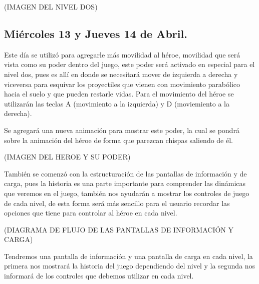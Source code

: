\documentclass{article}
\begin{document}
(IMAGEN DEL NIVEL DOS)

\subsection{Miércoles 13 y Jueves 14 de Abril.}
Este día se utilizó para agregarle más movilidad al héroe, movilidad que será vista como su poder dentro del juego, este poder será activado en especial para el nivel dos, pues es allí en donde se necesitará mover de izquierda a derecha y viceversa para esquivar los proyectiles que vienen con movimiento parabólico hacia el suelo y que pueden restarle vidas. Para el movimiento del héroe se utilizarán las teclas A (movimiento a la izquierda) y D (moviemiento a la derecha).

Se agregará una nueva animación para mostrar este poder, la cual se pondrá sobre la animación del héroe de forma que parezcan chispas saliendo de él.

(IMAGEN DEL HEROE Y SU PODER)

También se comenzó con la estructuración de las pantallas de información y de carga, pues la historia es una parte importante para comprender las dinámicas que veremos en el juego, también nos ayudarán a mostrar los controles de juego de cada nivel, de esta forma será más sencillo para el usuario recordar las opciones que tiene para controlar al héroe en cada nivel.

(DIAGRAMA DE FLUJO DE LAS PANTALLAS DE INFORMACIÓN Y CARGA)

Tendremos una pantalla de información y una pantalla de carga en cada nivel, la primera nos mostrará la historia del juego dependiendo del nivel y la segunda nos informará de los controles que debemos utilizar en cada nivel.
\end{document}

